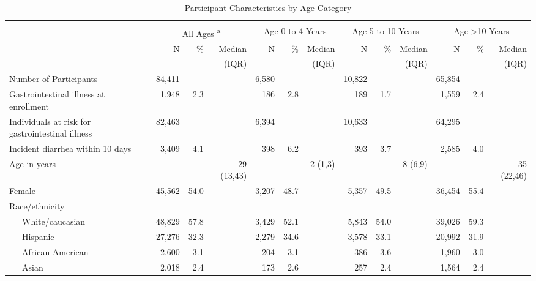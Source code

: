 \documentclass[12pt]{article}\usepackage[]{graphicx}\usepackage[]{color}
\begin{document}
\begin{landscape}
\begin{table}[h!tb]
\begin{center}
\caption{Participant Characteristics by Age Category \label{tab:ptable}}
\begin{scriptsize}
\begin{tabular}{l rrr rrr rrr rrr}
 & \\
  & \multicolumn{3}{c}{All Ages \textsuperscript{a}} & \multicolumn{3}{c}{Age 0 to 4 Years} & \multicolumn{3}{c}{Age 5 to 10 Years} & \multicolumn{3}{c}{Age >10 Years}   \\
    & N & \% & Median &  N & \% & Median & N & \% & Median  & N & \% & Median \\
  &  &  & (IQR) &  &  &  (IQR) &  &  &  (IQR) &  &  &  (IQR) \\
\hline
 Number of Participants & 84,411 &  &  & 6,580 &  &  & 10,822 &  &  & 65,854 &  &  \\ 
  Gastrointestinal illness at enrollment &  1,948 & 2.3 &  &   186 & 2.8 &  &    189 & 1.7 &  &  1,559 & 2.4 &  \\ 
  Individuals at risk for gastrointestinal illness & 82,463 &  &  & 6,394 &  &  & 10,633 &  &  & 64,295 &  &  \\ 
  Incident diarrhea within 10 days &  3,409 & 4.1 &  &   398 & 6.2 &  &    393 & 3.7 &  &  2,585 & 4.0 &  \\ 
  Age in years &  &  & 29 (13,43) &  &  & 2 (1,3) &  &  & 8 (6,9) &  &  & 35 (22,46) \\ 
  Female & 45,562 & 54.0 &  & 3,207 & 48.7 &  &  5,357 & 49.5 &  & 36,454 & 55.4 &  \\ 
  Race/ethnicity &  &  &  &  &  &  &  &  &  &  &  &  \\ 
  ~~~White/caucasian & 48,829 & 57.8 &  & 3,429 & 52.1 &  &  5,843 & 54.0 &  & 39,026 & 59.3 &  \\ 
  ~~~Hispanic & 27,276 & 32.3 &  & 2,279 & 34.6 &  &  3,578 & 33.1 &  & 20,992 & 31.9 &  \\ 
  ~~~African American &  2,600 & 3.1 &  &   204 & 3.1 &  &    386 & 3.6 &  &  1,960 & 3.0 &  \\ 
  ~~~Asian &  2,018 & 2.4 &  &   173 & 2.6 &  &    257 & 2.4 &  &  1,564 & 2.4 &  \\ 

\end{tabular}
\end{scriptsize}
\end{center}
\end{table}
\end{landscape}
\end{document}
